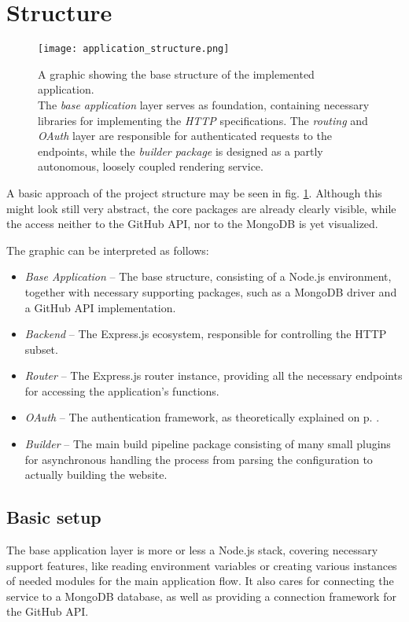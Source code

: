 \section{Structure}
\label{sec:structure}

\begin{figure}[b] %
    \centering
    \texttt{[image: application\_structure.png]}
    \caption{A graphic showing the base structure of the implemented application.\\ The \emph{base application} layer serves as foundation, containing necessary libraries for implementing the \emph{HTTP} specifications. The \emph{routing} and \emph{OAuth} layer are responsible for authenticated requests to the endpoints, while the \emph{builder package} is designed as a partly autonomous, loosely coupled rendering service.}
    \label{fig:application_structure}
\end{figure}
%

A basic approach of the project structure may be seen in fig. \ref{fig:application_structure}. Although this might look still very abstract, the core packages are already clearly visible, while the access neither to the GitHub API, nor to the MongoDB is yet visualized.

The graphic can be interpreted as follows:

\begin{itemize}
  \item \emph{Base Application} -- The base structure, consisting of a Node.js environment, together with necessary supporting packages, such as a MongoDB driver and a GitHub API implementation.
  \item \emph{Backend} -- The Express.js ecosystem, responsible for controlling the HTTP subset.
  \item \emph{Router} -- The Express.js router instance, providing all the necessary endpoints for accessing the application's functions.
  \item \emph{OAuth} -- The authentication framework, as theoretically explained on p. \pageref{sec:foundation-express-oauth}.
  \item \emph{Builder} -- The main build pipeline package consisting of many small plugins for asynchronous handling the process from parsing the configuration to actually building the website.
\end{itemize}

\subsection{Basic setup}
The base application layer is more or less a Node.js stack, covering necessary support features, like reading environment variables or creating various instances of needed modules for the main application flow. It also cares for connecting the service to a MongoDB database, as well as providing a connection framework for the GitHub API.


